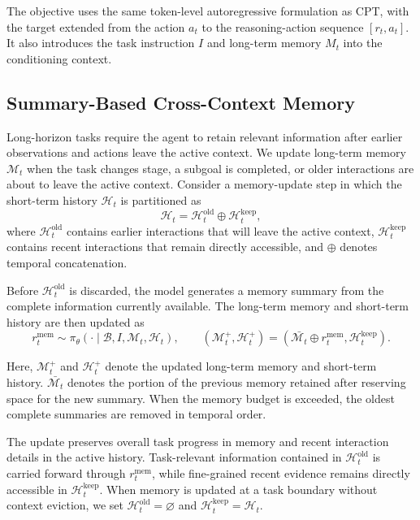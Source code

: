 The objective uses the same token-level autoregressive formulation as CPT, with the target extended from the action $a_t$ to the reasoning-action sequence $[r_t,a_t]$. It also introduces the task instruction $I$ and long-term memory $M_t$ into the conditioning context.

\subsection{Summary-Based Cross-Context Memory}
\label{sec:cross_context_memory}


Long-horizon tasks require the agent to retain relevant information after earlier observations and actions leave the active context. We update long-term memory $\mathcal{M}_t$ when the task changes stage, a subgoal is completed, or older interactions are about to leave the active context. Consider a memory-update step in which the short-term history $\mathcal{H}_t$ is partitioned as
\[
\mathcal{H}_t
=
\mathcal{H}_t^{\mathrm{old}}
\oplus
\mathcal{H}_t^{\mathrm{keep}},
\]
where $\mathcal{H}_t^{\mathrm{old}}$ contains earlier interactions that will leave the active context, $\mathcal{H}_t^{\mathrm{keep}}$ contains recent interactions that remain directly accessible, and $\oplus$ denotes temporal concatenation.

Before $\mathcal{H}_t^{\mathrm{old}}$ is discarded, the model generates a memory summary from the complete information currently available. The long-term memory and short-term history are then updated as
\begin{equation}
r_t^{\mathrm{mem}}
\sim
\pi_\theta
\left(
\cdot
\mid
\mathcal{B},I,\mathcal{M}_t,\mathcal{H}_t
\right),
\qquad
\left(
\mathcal{M}_t^{+},
\mathcal{H}_t^{+}
\right)
=
\left(
\bar {\mathcal{M}_t}
\oplus
r_t^{\mathrm{mem}},
\mathcal{H}_t^{\mathrm{keep}}
\right).
\label{eq:memory_update}
\end{equation}

Here, $\mathcal{M}_t^{+}$ and $\mathcal{H}_t^{+}$ denote the updated long-term memory and short-term history. $\bar {\mathcal{M}_t}$ denotes the portion of the previous memory retained after reserving space for the new summary. When the memory budget is exceeded, the oldest complete summaries are removed in temporal order.

The update preserves overall task progress in memory and recent interaction details in the active history. Task-relevant information contained in $\mathcal{H}_t^{\mathrm{old}}$ is carried forward through $r_t^{\mathrm{mem}}$, while fine-grained recent evidence remains directly accessible in $\mathcal{H}_t^{\mathrm{keep}}$. When memory is updated at a task boundary without context eviction, we set $\mathcal{H}_t^{\mathrm{old}}=\varnothing$ and $\mathcal{H}_t^{\mathrm{keep}}=\mathcal{H}_t$.

